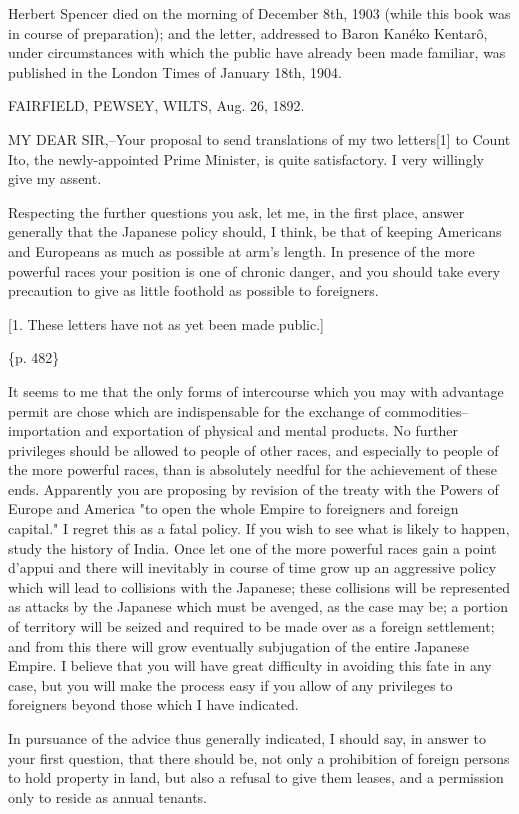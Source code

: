 Herbert Spencer died on the morning of December 8th, 1903 (while this book was in course of preparation); and the letter, addressed to Baron Kanéko Kentarô, under circumstances with which the public have already been made familiar, was published in the London Times of January 18th, 1904.

FAIRFIELD, PEWSEY, WILTS,
Aug. 26, 1892.       

MY DEAR SIR,--Your proposal to send translations of my two letters[1] to Count Ito, the newly-appointed Prime Minister, is quite satisfactory. I very willingly give my assent.

Respecting the further questions you ask, let me, in the first place, answer generally that the Japanese policy should, I think, be that of keeping Americans and Europeans as much as possible at arm's length. In presence of the more powerful races your position is one of chronic danger, and you should take every precaution to give as little foothold as possible to foreigners.

[1. These letters have not as yet been made public.]

\{p. 482\}

It seems to me that the only forms of intercourse which you may with advantage permit are chose which are indispensable for the exchange of commodities--importation and exportation of physical and mental products. No further privileges should be allowed to people of other races, and especially to people of the more powerful races, than is absolutely needful for the achievement of these ends. Apparently you are proposing by revision of the treaty with the Powers of Europe and America "to open the whole Empire to foreigners and foreign capital." I regret this as a fatal policy. If you wish to see what is likely to happen, study the history of India. Once let one of the more powerful races gain a point d'appui and there will inevitably in course of time grow up an aggressive policy which will lead to collisions with the Japanese; these collisions will be represented as attacks by the Japanese which must be avenged, as the case may be; a portion of territory will be seized and required to be made over as a foreign settlement; and from this there will grow eventually subjugation of the entire Japanese Empire. I believe that you will have great difficulty in avoiding this fate in any case, but you will make the process easy if you allow of any privileges to foreigners beyond those which I have indicated.

In pursuance of the advice thus generally indicated, I should say, in answer to your first question, that there should be, not only a prohibition of foreign persons to hold property in land, but also a refusal to give them leases, and a permission only to reside as annual tenants.

